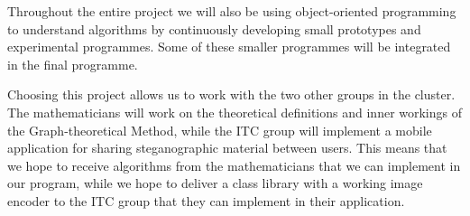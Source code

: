 Throughout the entire project we will also be using object-oriented programming to understand algorithms by continuously developing small prototypes and experimental programmes.
Some of these smaller programmes will be integrated in the final programme.

Choosing this project allows us to work with the two other groups in the cluster. The mathematicians will work on the theoretical definitions and inner workings of the Graph-theoretical Method, while the ITC group will implement a mobile application for sharing steganographic material between users. This means that we hope to receive algorithms from the mathematicians that we can implement in our program, while we hope to deliver a class library with a working image encoder to the ITC group that they can implement in their application.